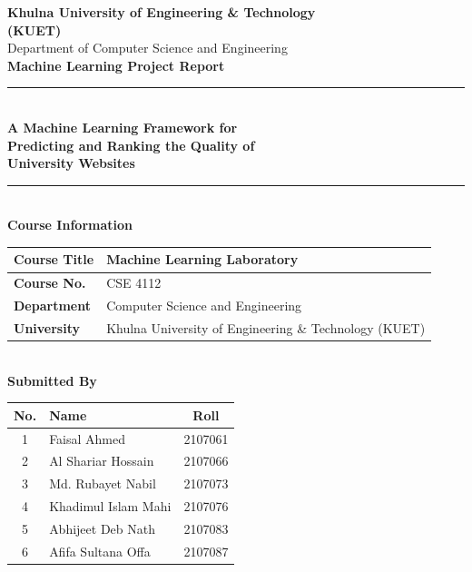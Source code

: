 \documentclass[11pt,a4paper]{article}
\begin{document}
\begin{titlepage}
\centering
\vspace*{0.5cm}

{\Large\bfseries Khulna University of Engineering \& Technology}\\[2pt]
{\Large\bfseries (KUET)}\\[6pt]
{\large Department of Computer Science and Engineering}\\[0.9cm]

{\large\bfseries Machine Learning Project Report}\\[0.8cm]

\rule{\textwidth}{0.9pt}\\[9pt]
{\LARGE\bfseries A Machine Learning Framework for\\[5pt]
Predicting and Ranking the Quality of\\[5pt]
University Websites}\\[9pt]
\rule{\textwidth}{0.9pt}\\[0.9cm]

{\large\bfseries Course Information}\\[5pt]
\begin{tabular}{|l|l|}
\hline
\textbf{Course Title} & Machine Learning Laboratory \\ \hline
\textbf{Course No.}   & CSE 4112 \\ \hline
\textbf{Department}   & Computer Science and Engineering \\ \hline
\textbf{University}   & Khulna University of Engineering \& Technology (KUET) \\ \hline
\end{tabular}\\[0.85cm]

{\large\bfseries Submitted By}\\[5pt]
\begin{tabular}{|c|l|c|}
\hline
\textbf{No.} & \textbf{Name} & \textbf{Roll} \\ \hline
1 & Faisal Ahmed          & 2107061 \\ \hline
2 & Al Shariar Hossain    & 2107066 \\ \hline
3 & Md. Rubayet Nabil     & 2107073 \\ \hline
4 & Khadimul Islam Mahi   & 2107076 \\ \hline
5 & Abhijeet Deb Nath     & 2107083 \\ \hline
6 & Afifa Sultana Offa    & 2107087 \\ \hline
\end{tabular}\\[0.85cm]


\end{titlepage}
\end{document}
